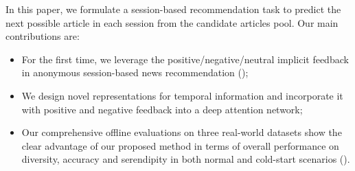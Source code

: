 In this paper, we formulate a session-based recommendation task to 
predict the next possible article 
in each session from the candidate articles pool. Our main contributions are:
\begin{itemize} 
\item For the first time, we leverage the positive/negative/neutral implicit feedback 
in anonymous session-based news recommendation ();
\item We design novel representations for temporal information 
and incorporate it with positive and negative feedback 
into a deep attention network;
\item Our comprehensive offline evaluations on three real-world datasets 
show the clear advantage of our proposed method in terms of overall performance on 
diversity, accuracy and serendipity in both normal and 
cold-start scenarios ().
\end{itemize}
